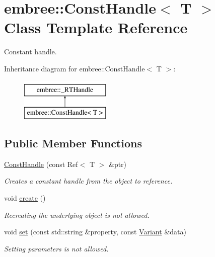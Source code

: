 \hypertarget{classembree_1_1_const_handle}{
\section{embree::ConstHandle$<$ T $>$ Class Template Reference}
\label{classembree_1_1_const_handle}
}


Constant handle.  


Inheritance diagram for embree::ConstHandle$<$ T $>$:\begin{figure}[H]
\begin{center}
\leavevmode
\includegraphics[height=2.000000cm]{classembree_1_1_const_handle}
\end{center}
\end{figure}
\subsection*{Public Member Functions}
\begin{DoxyCompactItemize}
\item 
\hyperlink{classembree_1_1_const_handle_a2584fca8a51990d8307767fff6acec4d}{ConstHandle} (const Ref$<$ T $>$ \&ptr)
\begin{DoxyCompactList}\small\item\em Creates a constant handle from the object to reference. \item\end{DoxyCompactList}\item 
void \hyperlink{classembree_1_1_const_handle_ac5daae8b49056b4ba1a775760868cd52}{create} ()
\begin{DoxyCompactList}\small\item\em Recreating the underlying object is not allowed. \item\end{DoxyCompactList}\item 
void \hyperlink{classembree_1_1_const_handle_a9815e3ec188766ce256495d0c7831a21}{set} (const std::string \&property, const \hyperlink{structembree_1_1_variant}{Variant} \&data)
\begin{DoxyCompactList}\small\item\em Setting parameters is not allowed. \item\end{DoxyCompactList}\end{DoxyCompactItemize}
